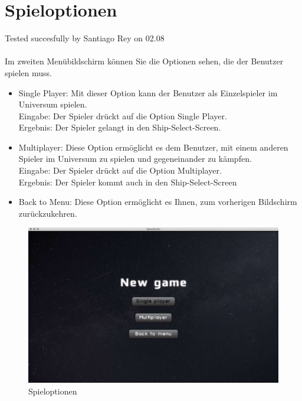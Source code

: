 \documentclass[12pt]{article}
\begin{document}
\section{Spieloptionen}
Tested succesfully by Santiago Rey on 02.08\\\\
Im zweiten Menübildschirm können Sie die Optionen sehen, die der Benutzer spielen muss.
\begin{itemize}
\item Single Player: Mit dieser Option kann der Benutzer als Einzelspieler im Universum spielen.\\
Eingabe: Der Spieler drückt auf die Option Single Player.\\
Ergebnis: Der Spieler gelangt in den Ship-Select-Screen.\\
\item Multiplayer: Diese Option ermöglicht es dem Benutzer, mit einem anderen Spieler im Universum zu spielen und gegeneinander zu kämpfen.\\
Eingabe: Der Spieler drückt auf die Option Multiplayer.\\
Ergebnis: Der Spieler kommt auch in den Ship-Select-Screen\\
\item Back to Menu: Diese Option ermöglicht es Ihnen, zum vorherigen Bildschirm zurückzukehren.
\end{itemize}
\begin{figure}[h]
\centering
\includegraphics[scale=0.4]{TestProtocolBilder/menuScreenTwo.jpg}
\caption{Spieloptionen}
\end{figure}
\newpage
\end{document}

